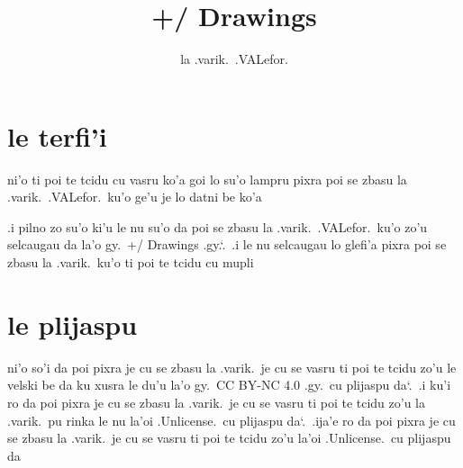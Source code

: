\documentclass{report}
\title{+/ Drawings}
\author{la .varik.\ .VALefor.}
\newcommand\sds{\spacefactor\sfcode`.\ \space}
\begin{document}
\maketitle{}
\tableofcontents{}
\chapter{le terfi'i}
ni'o ti poi te tcidu cu vasru ko'a goi lo su'o lampru pixra poi se zbasu la .varik.\ .VALefor.\ ku'o ge'u je lo datni be ko'a

.i pilno zo su'o ki'u le nu su'o da poi se zbasu la .varik.\ .VALefor.\ ku'o zo'u selcaugau da la'o gy.\ +/ Drawings .gy.\sds  .i le nu selcaugau lo glefi'a pixra poi se zbasu la .varik.\ ku'o ti poi te tcidu cu mupli

\chapter{le plijaspu}
ni'o so'i da poi pixra je cu se zbasu la .varik.\ je cu se vasru ti poi te tcidu zo'u le velski be da ku xusra le du'u la'o gy.\ CC BY-NC 4.0 .gy.\ cu plijaspu da\sds  .i ku'i ro da poi pixra je cu se zbasu la .varik.\ je cu se vasru ti poi te tcidu zo'u la .varik.\ pu rinka le nu la'oi .Unlicense.\ cu plijaspu da\sds  .ija'e ro da poi pixra je cu se zbasu la .varik.\ je cu se vasru ti poi te tcidu zo'u la'oi .Unlicense.\ cu plijaspu da
\end{document}
